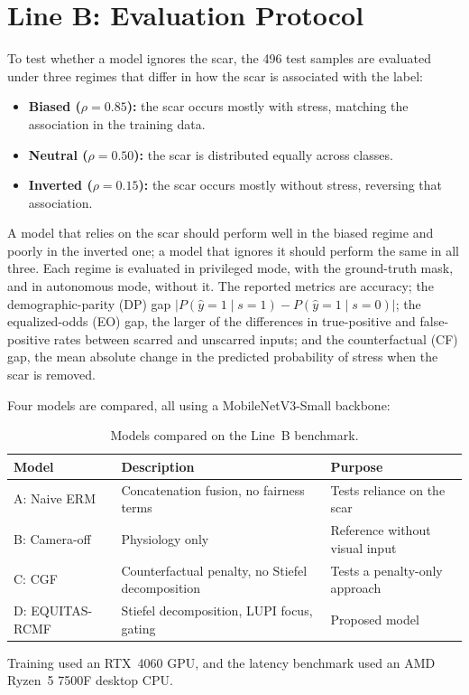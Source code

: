 \section{Line B: Evaluation Protocol}
\label{sec:lineB_protocol}
To test whether a model ignores the scar, the 496 test samples are evaluated under three regimes that differ in how the scar is associated with the label:
\begin{itemize}
    \item \textbf{Biased ($\rho = 0.85$):} the scar occurs mostly with stress, matching the association in the training data.
    \item \textbf{Neutral ($\rho = 0.50$):} the scar is distributed equally across classes.
    \item \textbf{Inverted ($\rho = 0.15$):} the scar occurs mostly without stress, reversing that association.
\end{itemize}
A model that relies on the scar should perform well in the biased regime and poorly in the inverted one; a model that ignores it should perform the same in all three. Each regime is evaluated in privileged mode, with the ground-truth mask, and in autonomous mode, without it. The reported metrics are accuracy; the demographic-parity (DP) gap $|P(\hat{y}=1 \mid s=1) - P(\hat{y}=1 \mid s=0)|$; the equalized-odds (EO) gap, the larger of the differences in true-positive and false-positive rates between scarred and unscarred inputs; and the counterfactual (CF) gap, the mean absolute change in the predicted probability of stress when the scar is removed.

Four models are compared, all using a MobileNetV3-Small backbone:
\begin{table}[htbp]
\centering
\begin{tabular}{@{}lll@{}}
\toprule
\textbf{Model} & \textbf{Description} & \textbf{Purpose} \\
\midrule
A: Naive ERM & Concatenation fusion, no fairness terms & Tests reliance on the scar \\
B: Camera-off & Physiology only & Reference without visual input \\
C: CGF & Counterfactual penalty, no Stiefel decomposition & Tests a penalty-only approach \\
D: EQUITAS-RCMF & Stiefel decomposition, LUPI focus, gating & Proposed model \\
\bottomrule
\end{tabular}
\caption{Models compared on the Line~B benchmark.}
\label{tab:ablation_models}
\end{table}
Training used an RTX~4060 GPU, and the latency benchmark used an AMD Ryzen~5 7500F desktop CPU.
